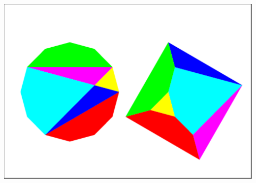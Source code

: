 \documentclass[a4paper,11pt]{book}
\begin{document}
\includegraphics[width=\textwidth]{carredode1}
\end{document}
